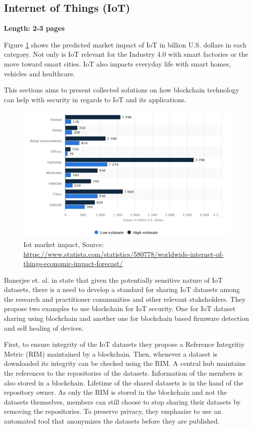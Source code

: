 \subsection{Internet of Things (IoT)}
\label{subsec:03_IoT}

\textbf{Length: 2-3 pages}

Figure \ref{fig:iot_market} shows the predicted market impact of IoT in billion U.S. dollars in each category.
Not only is IoT relevant for the Industry 4.0 with smart factories or the move toward smart cities. IoT also
impacts everyday life with smart homes, vehicles and healthcare.

This sections aims to present collected solutions on how  blockchain technology can help with security 
in regards to IoT and its applications.


\begin{figure}[ht!]
  \begin{center}
    \includegraphics[scale=0.6]{Talk7/img/iot/iot_statista}
  \end{center}
  \caption{Iot market impact, Source: \protect\url{https://www.statista.com/statistics/580778/worldwide-internet-of-things-economic-impact-forecast/} }
  \label{fig:iot_market}
\end{figure}

Banerjee et. al. in \cite{Banerjee2018} state that given the potentially sensitive nature of IoT datasets,
there is a need to develop a standard for sharing IoT datasets among the research and practitioner communities
and other relevant stakeholders. They propose two examples to use blockchain for IoT security. One for IoT dataset sharing using blockchain and another one for 
blockchain based firmware detection and self healing of devices.

First, to ensure integrity of the IoT datasets they propose a Reference Integritiy Metric (RIM) maintained by a blockchain. Then, whenever a dataset is downloaded its integrity can be checked using the RIM.
A central hub maintains the references to the repositories of the datasets. Information of the members is also stored in a blockchain. 
Lifetime of the shared datasets is in the hand of the repository owner.
As only the RIM is stored in the blockchain and not the datasets themselves, members can still choose to stop sharing their datasets by removing the repositories.
To preserve privacy, they emphasize to use an automated tool that anonymizes the datasets before they are published.


